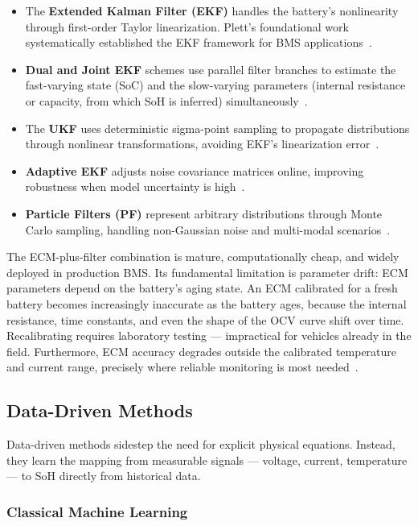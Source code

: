 \begin{itemize}
    \item The \textbf{Extended Kalman Filter (EKF)} handles the battery's nonlinearity through first-order Taylor linearization. Plett's foundational work systematically established the EKF framework for BMS applications~\autocite{ECM_EKF}.
    \item \textbf{Dual and Joint EKF} schemes use parallel filter branches to estimate the fast-varying state (SoC) and the slow-varying parameters (internal resistance or capacity, from which SoH is inferred) simultaneously~\autocite{ECM_djEKF}.
    \item The \textbf{\gls{UKF}} uses deterministic sigma-point sampling to propagate distributions through nonlinear transformations, avoiding EKF's linearization error~\autocite{ECM_UKF,plett2006spkf}.
    \item \textbf{Adaptive EKF} adjusts noise covariance matrices online, improving robustness when model uncertainty is high~\autocite{ECM_aEKF}.
    \item \textbf{Particle Filters (PF)} represent arbitrary distributions through Monte Carlo sampling, handling non-Gaussian noise and multi-modal scenarios~\autocite{ECM_PF}.
\end{itemize}

The ECM-plus-filter combination is mature, computationally cheap, and widely deployed in production BMS. Its fundamental limitation is parameter drift: ECM parameters depend on the battery's aging state. An ECM calibrated for a fresh battery becomes increasingly inaccurate as the battery ages, because the internal resistance, time constants, and even the shape of the OCV curve shift over time. Recalibrating requires laboratory testing --- impractical for vehicles already in the field. Furthermore, ECM accuracy degrades outside the calibrated temperature and current range, precisely where reliable monitoring is most needed~\autocite{ECM_EKF}.

\subsection{Data-Driven Methods}

Data-driven methods sidestep the need for explicit physical equations. Instead, they learn the mapping from measurable signals --- voltage, current, temperature --- to SoH directly from historical data.

\subsubsection*{Classical Machine Learning}

